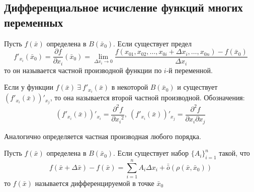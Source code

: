 \subsection{Дифференциальное исчисление функций многих переменных}
\begin{definition}
    Пусть $f(\bar{x})$ определена в $B(\bar{x}_0)$. Если существует предел
    \[f'_{x_i}(\bar{x}_0)=\frac{\partial {f}}{\partial {x_i}}(\bar{x}_0)=\lim\limits_{\Delta x_i\to 0}\frac{f(x_{01}, x_{02}, \dots, x_{0i}+\Delta x_i, \dots, x_{0n})-f(\bar{x}_0)}{\Delta x_i}\]
    то он называется частной производной функции по $i$-й переменной.
\end{definition} 
\begin{definition}
    Если у функции $f(\bar{x})\ \exists\ f'_{x_i}(\bar{x})$ в некоторой $B(\bar{x}_0)$ и существует $(f'_{x_i}(\bar{x}))'_{x_j}$, то она называется второй частной производной. Обозначения:
    \[(f'_{x_i}(\bar{x}))'_{x_i}=\frac{\partial^2 {f}}{\partial {x_i}^2},\ (f'_{x_i}(\bar{x}))'_{x_j}=\frac{\partial^2 {f}}{\partial {x_i}\partial {x_j}}\]
\end{definition} 
\begin{comm}
    Аналогично определяется частная производная любого порядка.
\end{comm}
\begin{definition}
    Пусть $f(\bar{x})$ определена в $B(\bar{x}_0)$. Если существует набор $\{A_i\}_{i=1}^n$ такой, что
    \[f(\bar{x}+\Delta \bar{x})-f(\bar{x})=\sum\limits_{i=1}^{n}A_i \Delta x_i +\bar{\bar{o}}{(\rho(\bar{x}, \bar{x}_0))}\]
    то $f(\bar{x})$ называется дифференцируемой в точке $\bar{x}_0$
\end{definition} 
